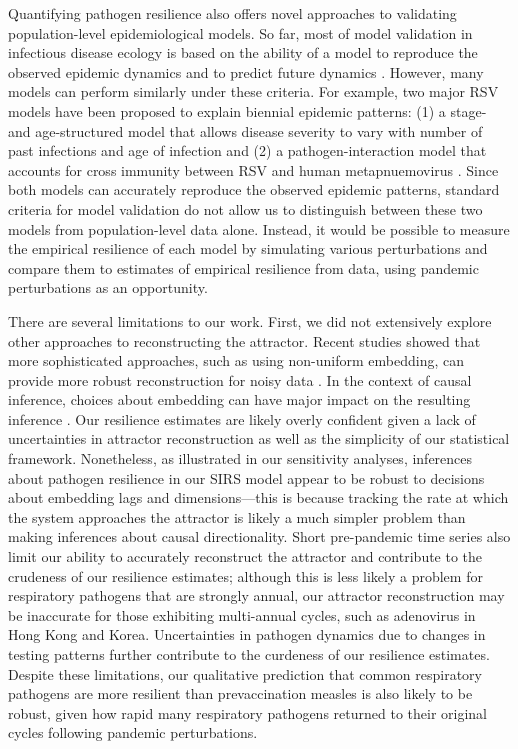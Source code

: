 \documentclass[12pt]{article}
\begin{document}
Quantifying pathogen resilience also offers novel approaches to validating population-level epidemiological models.
So far, most of model validation in infectious disease ecology is based on the ability of a model to reproduce the observed epidemic dynamics and to predict future dynamics \citep{grenfell2002dynamics,bhattacharyya2015cross,pitzer2015environmental,dean2018human,pons2018serotype}.
However, many models can perform similarly under these criteria.
For example, two major RSV models have been proposed to explain biennial epidemic patterns: (1) a stage- and age-structured model that allows disease severity to vary with number of past infections and age of infection \citep{pitzer2015environmental} and (2) a pathogen-interaction model that accounts for cross immunity between RSV and human metapnuemovirus \citep{bhattacharyya2015cross}.
Since both models can accurately reproduce the observed epidemic patterns, standard criteria for model validation do not allow us to distinguish between these two models from population-level data alone.
Instead, it would be possible to measure the empirical resilience of each model by simulating various perturbations and compare them to estimates of empirical resilience from data, using pandemic perturbations as an opportunity.

There are several limitations to our work.
First, we did not extensively explore other approaches to reconstructing the attractor.
Recent studies showed that more sophisticated approaches, such as using non-uniform embedding, can provide more robust reconstruction for noisy data \citep{tan2023selecting}.
In the context of causal inference, choices about embedding can have major impact on the resulting inference \citep{cobey2016limits}.
Our resilience estimates are likely overly confident given a lack of uncertainties in attractor reconstruction as well as the simplicity of our statistical framework.
Nonetheless, as illustrated in our sensitivity analyses, inferences about pathogen resilience in our SIRS model appear to be robust to decisions about embedding lags and dimensions---this is because tracking the rate at which the system approaches the attractor is likely a much simpler problem than making inferences about causal directionality.
Short pre-pandemic time series also limit our ability to accurately reconstruct the attractor and contribute to the crudeness of our resilience estimates;
although this is less likely a problem for respiratory pathogens that are strongly annual, our attractor reconstruction may be inaccurate for those exhibiting multi-annual cycles, such as adenovirus in Hong Kong and Korea.
Uncertainties in pathogen dynamics due to changes in testing patterns further contribute to the curdeness of our resilience estimates.
Despite these limitations, our qualitative prediction that common respiratory pathogens are more resilient than prevaccination measles is also likely to be robust, given how rapid many respiratory pathogens returned to their original cycles following pandemic perturbations.
\end{document}

